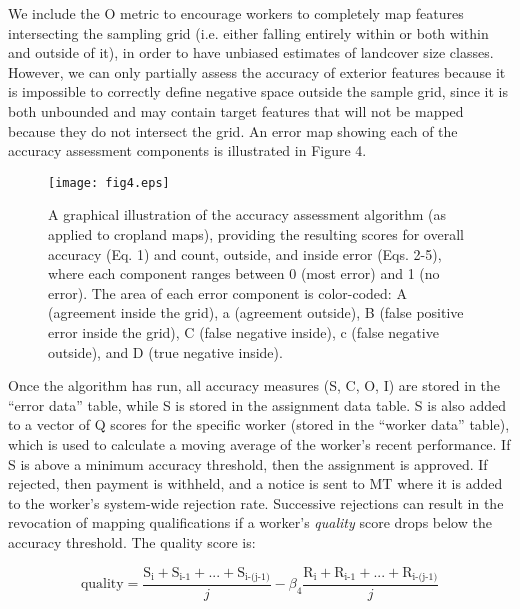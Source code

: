 \documentclass[preprint,12pt,authoryear]{elsarticle}
\begin{document}
We include the O metric to encourage workers to completely map features intersecting the sampling grid (i.e. either falling entirely within or both within and outside of it), in order to have unbiased estimates of landcover size classes. However, we can only partially assess the accuracy of exterior features because it is impossible to correctly define negative space outside the sample grid, since it is both unbounded and may contain target features that will not be mapped because they do not intersect the grid. An error map showing each of the accuracy assessment components is illustrated in Figure 4.

\begin{figure}[!ht]
  \begin{center}
    \texttt{[image: fig4.eps]}
    \caption{A graphical illustration of the accuracy assessment algorithm (as applied to cropland maps), providing the resulting scores for overall accuracy (Eq. 1) and count, outside, and inside error (Eqs. 2-5), where each component ranges between 0 (most error) and 1 (no error). The area of each error component is color-coded: A (agreement inside the grid), a (agreement outside), B (false positive error inside the grid), C (false negative inside), c (false negative outside), and D (true negative inside). }
    \label{default}
  \end{center}
\end{figure}

Once the algorithm has run, all accuracy measures (S, C, O, I) are stored in the ``error data'' table, while S is stored in the assignment data table. S is also added to a vector of Q scores for the specific worker (stored in the ``worker data'' table), which is used to calculate a moving average of the worker's recent performance.  If S is above a minimum accuracy threshold, then the assignment is approved. If rejected, then payment is withheld, and a notice is sent to MT where it is added to the worker's system-wide rejection rate. Successive rejections can result in the revocation of mapping qualifications if a worker's \emph{quality} score drops below the accuracy threshold. The quality score is:

\begin{equation}
  \textrm{quality} = \frac{{\textrm{S}_{\textrm{i}} + \textrm{S}_{\textrm{i-1}} + ... + \textrm{S}_\textrm{i-(j-1)}}}{j} - \beta_4\frac{{\textrm{R}_{\textrm{i}} + \textrm{R}_{\textrm{i-1}} + ... + \textrm{R}_\textrm{i-(j-1)}}}{j}
\end{equation}
\end{document}
